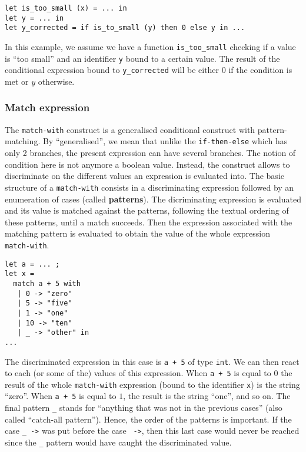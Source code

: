 {\scriptsize
\begin{lstlisting}
let is_too_small (x) = ... in
let y = ... in
let y_corrected = if is_to_small (y) then 0 else y in ...
\end{lstlisting}}

In this example, we assume we have a function {\tt is\_too\_small}
checking if a value is ``too small'' and an identifier {\tt y} bound
to a certain value. The result of the conditional expression bound to
{\tt y\_corrected} will be either $0$ if the condition is met or $y$
otherwise.



\subsubsection{Match expression}
  

The {\tt match-with} construct is a generalised conditional construct
with pattern-matching. By ``generalised'', we mean that unlike the
{\tt if-then-else} which has only 2 branches, the present expression
can have several branches. The notion of condition here is not anymore
a boolean value. Instead, the construct allows to discriminate on the
different values an expression is evaluated into. The basic structure
of a {\tt match-with} consists in a discriminating expression followed
by an enumeration of cases (called {\bf patterns}). The dicriminating
expression is evaluated and its value is matched against the patterns,
following the textual ordering of these patterns, until a match
succeeds. Then the expression associated with the matching pattern is
evaluated to obtain the value of the whole expression {\tt
  match-with}.

{\scriptsize
\begin{lstlisting}
let a = ... ;
let x =
  match a + 5 with
   | 0 -> "zero"
   | 5 -> "five"
   | 1 -> "one"
   | 10 -> "ten"
   | _ -> "other" in
...
\end{lstlisting}}

The discriminated expression in this case is {\tt a + 5} of type
{\tt int}. We can then react to each (or some of the) values of this
expression. When {\tt a + 5}  is equal to $0$ the result of the
whole {\tt match-with} expression (bound to the identifier {\tt x}) is
the string ``zero''. When {\tt a + 5} is equal to $1$, the result is the string
``one'', and so on. The final pattern {\tt \_} stands for ``anything
that was not in the previous cases'' (also called ``catch-all
pattern''). Hence, the order of the patterns is important. If the
case {\tt \vertical \_ ->} was put before the case {\tt {} ->},
then this last case would never be reached since the {\tt \_} pattern
would have caught the discriminated value.



